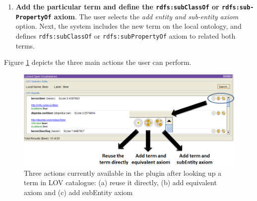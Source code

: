 \begin{enumerate}
\vspace{-1mm}\item \textbf{Add the particular term and define the {\tt rdfs:subClassOf} or {\tt rdfs:sub-}\\
{\tt PropertyOf} axiom}. The user selects the \emph{add entity and sub-entity axiom} option. Next, the system includes the new term on the local ontology, and defines {\tt rdfs:subClassOf} or {\tt rdfs:subPropertyOf} axiom to related both terms.
\end{enumerate}

Figure \ref{fig:LOVoptions} depicts the three main actions the user can perform. %

\begin{figure}[b!ht]
\center
\includegraphics[scale=0.4]{img/LOVOptions.png}
\caption{Three actions currently available in the plugin after looking up a term in LOV catalogue: (a) reuse it directly, (b) add equivalent axiom and (c) add subEntity axiom}
\label{fig:LOVoptions}
\end{figure}



